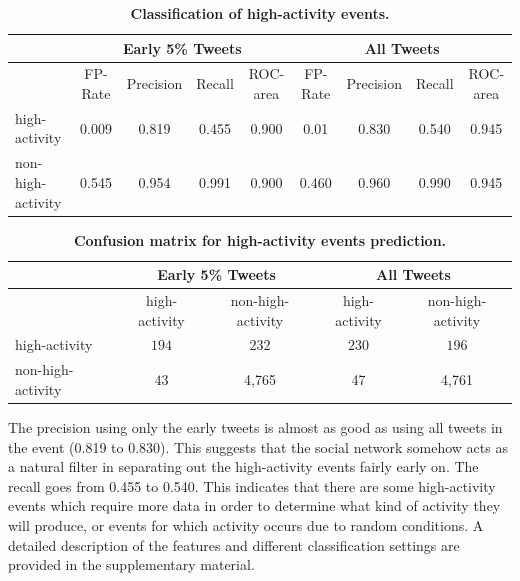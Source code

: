 \documentclass[10pt,letterpaper]{article}
\newcommand{\inblue}[1]{{\color{MyBlue}\sf\textbf{\textsc{#1}}}}
\newcommand{\supplementary}[0]{\inblue{[Supplementary Material]}}
\begin{document}
\begin{table}
  \centering
  {\small
    \begin{tabularx}{\textwidth}{lcccc|cccc}
      \toprule
      & \multicolumn{4}{c}{\textbf{Early 5\% Tweets}} & \multicolumn{4}{c}{\textbf{All Tweets}} \\
      \midrule
      & FP-Rate & Precision & Recall & ROC-area & FP-Rate & Precision & Recall & ROC-area \\
      high-activity & 0.009 & 0.819 & 0.455 & 0.900 & 0.01 & 0.830 & 0.540 & 0.945 \\
      non-high-activity & 0.545 & 0.954 & 0.991 & 0.900 &  0.460 & 0.960 & 0.990 & 0.945 \\
      \bottomrule
    \end{tabularx}
  }
  \caption{\textbf{Classification of high-activity events.}}
  \label{tab:classification_results}
\end{table}

\begin{table}
  \centering
  \begin{tabularx}{\textwidth}{lcc|cc}
    \toprule
    \multirow{2}{*}{ }& \multicolumn{2}{c}{\textbf{Early 5\% Tweets}} & \multicolumn{2}{c}{\textbf{All Tweets}} \\
    \midrule
    & high-activity & non-high-activity & high-activity & non-high-activity \\
    high-activity & $194$ & $232$ & $230$ & $196$\\
    non-high-activity & $43$ & 4,765 & 47 & 4,761 \\
    \bottomrule
  \end{tabularx}
  \caption{\textbf{Confusion matrix for high-activity events prediction.}}
  \label{tab:confusion_matrix}
\end{table}



The precision using only the early tweets is almost as good as using
all tweets in the event (0.819 to 0.830). This suggests that the
social network somehow acts as a natural filter in separating out the
high-activity events fairly early on.  The recall goes from 0.455 to
0.540. This indicates that there are some high-activity events which
require more data in order to determine what kind of activity they will
produce, or events for which activity occurs due to random conditions. A
detailed description of the features and different classification
settings are provided in the supplementary material.%
\end{document}
